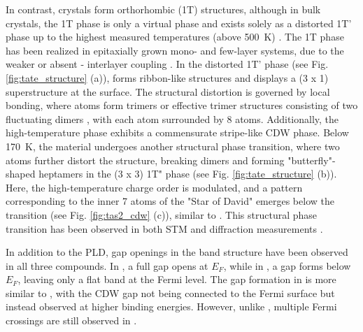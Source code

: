 In contrast,  crystals form orthorhombic (1T) structures, although in bulk crystals, the 1T phase is only a virtual phase and exists solely as a distorted 1T' phase up to the highest measured temperatures (above \qty{500}{\kelvin}) \cite{petkov_exotic_2020}.
The 1T phase has been realized in epitaxially grown mono- and few-layer systems, due to the weaker or absent - interlayer coupling \cite{hwang_novel_2022, wang_polymorphic_2024}.
In the distorted 1T' phase (see Fig. \ref{fig:tate_structure} (a)),  forms ribbon-like structures and displays a (3 x 1) superstructure at the surface.
The structural distortion is governed by local bonding, where  atoms form trimers or effective trimer structures consisting of two fluctuating dimers \cite{katayama_observation_2023}, with each  atom surrounded by 8  atoms.
Additionally, the high-temperature phase exhibits a commensurate stripe-like CDW phase.
Below \qty{170}{\kelvin}, the material undergoes another structural phase transition, where two  atoms further distort the structure, breaking dimers and forming "butterfly"-shaped heptamers in the (3 x 3) 1T" phase \cite{feng_charge_2016, katayama_observation_2023} (see Fig. \ref{fig:tate_structure} (b)).
Here, the high-temperature charge order is modulated, and a pattern corresponding to the inner 7 atoms of the "Star of David" emerges below the transition (see Fig. \ref{fig:tas2_cdw} (c)), similar to .
This structural phase transition has been observed in both STM and diffraction measurements \cite{feng_charge_2016, siddiqui_ultrafast_2021, domrose_femtosecond_2024}.

In addition to the PLD, gap openings in the band structure have been observed in all three compounds.
In , a full gap opens at $E_F$, while in , a gap forms below $E_F$, leaving only a flat band at the Fermi level.
The gap formation in  is more similar to , with the CDW gap not being connected to the Fermi surface but instead observed at higher binding energies.
However, unlike , multiple Fermi crossings are still observed in  \cite{lin_evidence_2022, mitsuishi_unveiling_2024}.

